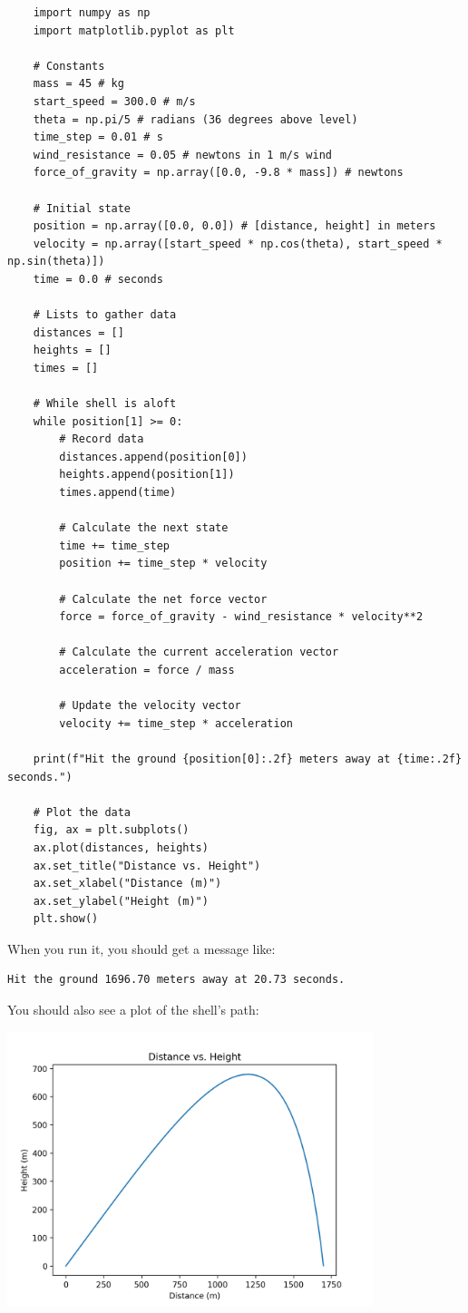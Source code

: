 \begin{Verbatim}
    import numpy as np
    import matplotlib.pyplot as plt
    
    # Constants
    mass = 45 # kg
    start_speed = 300.0 # m/s
    theta = np.pi/5 # radians (36 degrees above level)
    time_step = 0.01 # s
    wind_resistance = 0.05 # newtons in 1 m/s wind
    force_of_gravity = np.array([0.0, -9.8 * mass]) # newtons
    
    # Initial state
    position = np.array([0.0, 0.0]) # [distance, height] in meters
    velocity = np.array([start_speed * np.cos(theta), start_speed * np.sin(theta)])
    time = 0.0 # seconds
    
    # Lists to gather data
    distances = []
    heights = []
    times = []
    
    # While shell is aloft
    while position[1] >= 0:
        # Record data
        distances.append(position[0])
        heights.append(position[1])
        times.append(time)
    
        # Calculate the next state
        time += time_step
        position += time_step * velocity
    
        # Calculate the net force vector
        force = force_of_gravity - wind_resistance * velocity**2
    
        # Calculate the current acceleration vector
        acceleration = force / mass
    
        # Update the velocity vector   
        velocity += time_step * acceleration
    
    print(f"Hit the ground {position[0]:.2f} meters away at {time:.2f} seconds.")
    
    # Plot the data
    fig, ax = plt.subplots()
    ax.plot(distances, heights)
    ax.set_title("Distance vs. Height")
    ax.set_xlabel("Distance (m)")
    ax.set_ylabel("Height (m)")
    plt.show()        
\end{Verbatim}

When you run it, you should get a message like:
\begin{Verbatim}
Hit the ground 1696.70 meters away at 20.73 seconds.
\end{Verbatim}

You should also see a plot of the shell's path:

\includegraphics[width=0.8\textwidth]{artillery.png}

